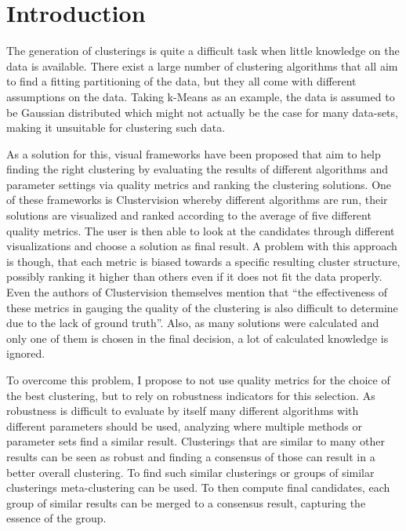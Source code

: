 \iffalse  \fi

\chapter{Introduction}
\label{cha:Introduction}

The generation of clusterings is quite a difficult task when little knowledge on the data is available. There exist a large number of clustering algorithms that all aim to find a fitting partitioning of the data, but they all come with different assumptions on the data. Taking k-Means as an example, the data is assumed to be Gaussian distributed which might not actually be the case for many data-sets, making it unsuitable for clustering such data. 

As a solution for this, visual frameworks have been proposed that aim to help finding the right clustering by evaluating the results of different algorithms and parameter settings via quality metrics and ranking the clustering solutions. One of these frameworks is Clustervision \cite{Kwon2018ClustervisionVS} whereby different algorithms are run, their solutions are visualized and ranked according to the average of five different quality metrics. The user is then able to look at the candidates through different visualizations and choose a solution as final result. A problem with this approach is though, that each metric is biased towards a specific resulting cluster structure, possibly ranking it higher than others even if it does not fit the data properly. Even the authors of Clustervision themselves mention that ``the effectiveness of these metrics in gauging the quality of the clustering is also difficult to determine due to the lack of ground truth''. Also, as many solutions were calculated and only one of them is chosen in the final decision, a lot of calculated knowledge is ignored.

To overcome this problem, I propose to not use quality metrics for the choice of the best clustering, but to rely on robustness indicators for this selection. As robustness is difficult to evaluate by itself many different algorithms with different parameters should be used, analyzing where multiple methods or parameter sets find a similar result. Clusterings that are similar to many other results can be seen as robust and finding a consensus of those can result in a better overall clustering. To find such similar clusterings or groups of similar clusterings meta-clustering can be used. To then compute final candidates, each group of similar results can be merged to a consensus result, capturing the essence of the group. 

